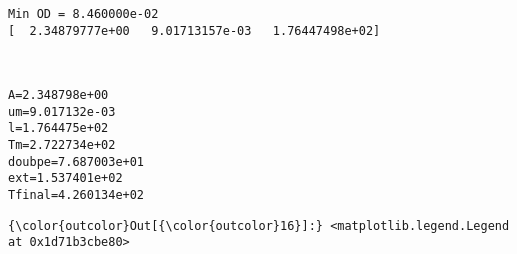 \documentclass[11pt]{article}
\begin{document}
    \begin{Verbatim}[commandchars=\\\{\}]
Min OD = 8.460000e-02
[  2.34879777e+00   9.01713157e-03   1.76447498e+02]

    \end{Verbatim}

    \begin{center}
    \end{center}
    { \hspace*{\fill} \\}
    
    \begin{Verbatim}[commandchars=\\\{\}]
A=2.348798e+00
um=9.017132e-03
l=1.764475e+02
Tm=2.722734e+02
doubpe=7.687003e+01
ext=1.537401e+02
Tfinal=4.260134e+02

    \end{Verbatim}

            \begin{Verbatim}[commandchars=\\\{\}]
{\color{outcolor}Out[{\color{outcolor}16}]:} <matplotlib.legend.Legend at 0x1d71b3cbe80>
\end{Verbatim}
        
    \begin{center}
    \end{center}
    { \hspace*{\fill} \\}
    
    \begin{center}
    \end{center}
    { \hspace*{\fill} \\}
    
\end{document}
